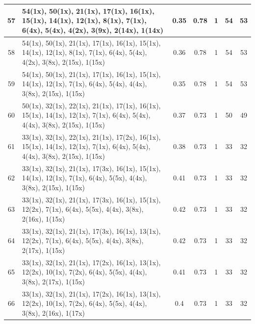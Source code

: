 \begin{small}
\begin{longtable}{|c|p{4cm}|c|c|c|c|c|}
  57 & 54(1x), 50(1x), 21(1x), 17(1x), 16(1x), 15(1x), 14(1x), 12(1x), 8(1x), 7(1x), 6(4x), 5(4x), 4(2x), 3(9x), 2(14x), 1(14x) & \cellcolor{colorGood}  0.35 & \cellcolor{colorGood} 0.78 & 1 & 54 & \cellcolor{colorBad} 53 \\   \hline
  58 & 54(1x), 50(1x), 21(1x), 17(1x), 16(1x), 15(1x), 14(1x), 12(1x), 8(1x), 7(1x), 6(4x), 5(4x), 4(2x), 3(8x), 2(15x), 1(15x) & \cellcolor{colorGood}  0.36 & \cellcolor{colorGood} 0.78 & 1 & 54 & \cellcolor{colorBad} 53 \\   \hline
  59 & 54(1x), 50(1x), 21(1x), 17(1x), 16(1x), 15(1x), 14(1x), 12(1x), 7(1x), 6(4x), 5(4x), 4(4x), 3(8x), 2(15x), 1(15x) & \cellcolor{colorGood}  0.35 & \cellcolor{colorGood} 0.78 & 1 & 54 & \cellcolor{colorBad} 53 \\   \hline
  60 & 50(1x), 32(1x), 22(1x), 21(1x), 17(1x), 16(1x), 15(1x), 14(1x), 12(1x), 7(1x), 6(4x), 5(4x), 4(4x), 3(8x), 2(15x), 1(15x) & \cellcolor{colorGood}  0.37 & \cellcolor{colorGood} 0.73 & 1 & 50 & \cellcolor{colorBad} 49 \\   \hline
  61 & 33(1x), 32(1x), 22(1x), 21(1x), 17(2x), 16(1x), 15(1x), 14(1x), 12(1x), 7(1x), 6(4x), 5(4x), 4(4x), 3(8x), 2(15x), 1(15x) & \cellcolor{colorGood}  0.38 & \cellcolor{colorGood} 0.73 & 1 & 33 & \cellcolor{colorBad} 32 \\   \hline
  62 & 33(1x), 32(1x), 21(1x), 17(3x), 16(1x), 15(1x), 14(1x), 12(1x), 7(1x), 6(4x), 5(5x), 4(4x), 3(8x), 2(15x), 1(15x) & \cellcolor{colorGood}  0.41 & \cellcolor{colorGood} 0.73 & 1 & 33 & \cellcolor{colorBad} 32 \\   \hline
  63 & 33(1x), 32(1x), 21(1x), 17(3x), 16(1x), 15(1x), 12(2x), 7(1x), 6(4x), 5(5x), 4(4x), 3(8x), 2(16x), 1(15x) & \cellcolor{colorGood}  0.42 & \cellcolor{colorGood} 0.73 & 1 & 33 & \cellcolor{colorBad} 32 \\   \hline
  64 & 33(1x), 32(1x), 21(1x), 17(3x), 16(1x), 13(1x), 12(2x), 7(1x), 6(4x), 5(5x), 4(4x), 3(8x), 2(17x), 1(15x) & \cellcolor{colorGood}  0.42 & \cellcolor{colorGood} 0.73 & 1 & 33 & \cellcolor{colorBad} 32 \\   \hline
  65 & 33(1x), 32(1x), 21(1x), 17(2x), 16(1x), 13(1x), 12(2x), 10(1x), 7(2x), 6(4x), 5(5x), 4(4x), 3(8x), 2(17x), 1(15x) & \cellcolor{colorGood}  0.41 & \cellcolor{colorGood} 0.73 & 1 & 33 & \cellcolor{colorBad} 32 \\   \hline
  66 & 33(1x), 32(1x), 21(1x), 17(2x), 16(1x), 13(1x), 12(2x), 10(1x), 7(2x), 6(4x), 5(5x), 4(4x), 3(8x), 2(16x), 1(17x) & \cellcolor{colorGood}  0.4 & \cellcolor{colorGood} 0.73 & 1 & 33 & \cellcolor{colorBad} 32 \\   \hline

\end{longtable}
\end{small}
